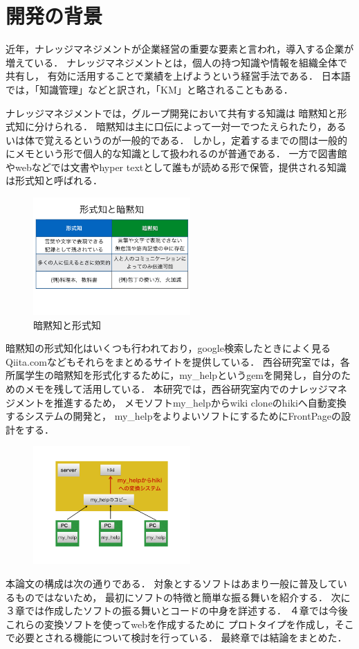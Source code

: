 \section{開発の背景}
近年，ナレッジマネジメントが企業経営の重要な要素と言われ，導入する企業が増えている．
ナレッジマネジメントとは，個人の持つ知識や情報を組織全体で共有し，
有効に活用することで業績を上げようという経営手法である．
日本語では，「知識管理」などと訳され，「KM」と略されることもある\cite{a}．

ナレッジマネジメントでは，グループ開発において共有する知識は
暗黙知と形式知に分けられる\cite{b}．
暗黙知は主に口伝によって一対一でつたえられたり，あるいは体で覚えるというのが一般的である．
しかし，定着するまでの間は一般的にメモという形で個人的な知識として扱われるのが普通である．
一方で図書館やwebなどでは文書やhyper textとして誰もが読める形で保管，提供される知識は形式知と呼ばれる．

\begin{figure}[htbp]
\begin{center}
\includegraphics[width=6cm,bb=100 100 600 700]{my_help2hiki_saki.001.png}
\caption{暗黙知と形式知}
\label{default}\end{center}\end{figure}


暗黙知の形式知化はいくつも行われており，google検索したときによく見るQiita.comなどもそれらをまとめるサイトを提供している．
西谷研究室では，各所属学生の暗黙知を形式化するために，my\_helpというgemを開発し，自分のためのメモを残して活用している．
本研究では，西谷研究室内でのナレッジマネジメントを推進するため，
メモソフトmy\_helpからwiki cloneのhikiへ自動変換するシステムの開発と，
my\_helpをよりよいソフトにするためにFrontPageの設計をする．

\begin{figure}[htbp]
\begin{center}
\includegraphics[width=6cm,bb=100 100 600 700]{my_help2hiki_saki.011.png}
\caption{}
\label{default}\end{center}\end{figure}

本論文の構成は次の通りである．
対象とするソフトはあまり一般に普及しているものではないため，
最初にソフトの特徴と簡単な振る舞いを紹介する．
次に３章では作成したソフトの振る舞いとコードの中身を詳述する．
４章では今後これらの変換ソフトを使ってwebを作成するために
プロトタイプを作成し，そこで必要とされる機能について検討を行っている．
最終章では結論をまとめた．

